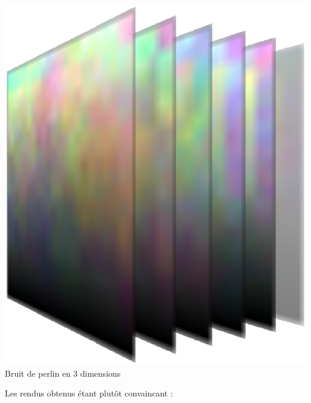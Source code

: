 \documentclass[a4paper,10pt]{article}
\begin{document}
\begin{center}
\includegraphics[scale=0.5]{Perlin3D.ps}\\
Bruit de perlin en 3 dimensions\\
\end{center}

\newpage

Les rendus obtenus étant plutôt convaincant :\\
\end{document}
